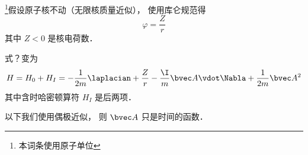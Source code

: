 
\begin{issues}
\issueDraft
\end{issues}


\footnote{本词条使用原子单位}假设原子核不动（无限核质量近似）， 使用库仑规范得
\begin{equation}
\varphi = \frac{Z}{r}
\end{equation}
其中 $Z < 0$ 是核电荷数．

式？变为
\begin{equation}
H = H_0 + H_I = -\frac{1}{2m} \laplacian +  \frac{Z}{r} - \frac{\I}{m} \bvec A \vdot \Nabla + \frac{1}{2m} \bvec A^2
\end{equation}
其中含时哈密顿算符 $H_I$ 是后两项．

以下我们使用偶极近似， 则 $\bvec A$ 只是时间的函数．
